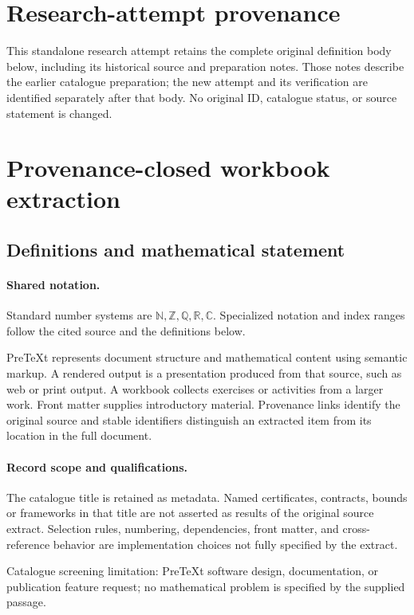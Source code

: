 \documentclass[11pt]{article}
\begin{document}
\section*{Research-attempt provenance}
This standalone research attempt retains the complete original definition body below,
including its historical source and preparation notes. Those notes describe the
earlier catalogue preparation; the new attempt and its verification are identified
separately after that body. No original ID, catalogue status, or source statement is changed.

\section{Provenance-closed workbook extraction}\label{statement}

\subsection{Definitions and mathematical statement}

\paragraph{Shared notation.}Standard number systems are $\mathbb N,\mathbb Z,\mathbb Q,\mathbb R,\mathbb C$. Specialized notation and index ranges follow the cited source and the definitions below.


PreTeXt represents document structure and mathematical content using semantic markup. A rendered output is a presentation produced from that source, such as web or print output. A workbook collects exercises or activities from a larger work. Front matter supplies introductory material. Provenance links identify the original source and stable identifiers distinguish an extracted item from its location in the full document.
\paragraph{Record scope and qualifications.}
The catalogue title is retained as metadata. Named certificates, contracts, bounds or frameworks in that title are not asserted as results of the original source extract.
Selection rules, numbering, dependencies, front matter, and cross-reference behavior are implementation choices not fully specified by the extract.

Catalogue screening limitation: PreTeXt software design, documentation, or publication feature request; no mathematical problem is specified by the supplied passage.
\end{document}
